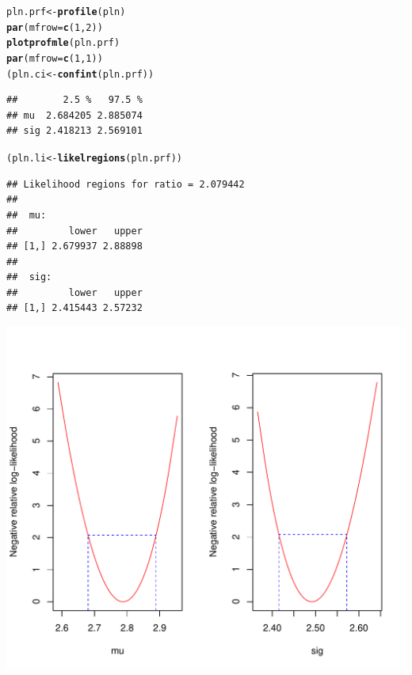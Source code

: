 \documentclass[12pt, A4]{article}\usepackage[]{graphicx}\usepackage[]{color}
\makeatletter
\def\maxwidth{ %
  \ifdim\Gin@nat@width>\linewidth
    \linewidth
  \else
    \Gin@nat@width
  \fi
}
\newcommand{\hlnum}[1]{\textcolor[rgb]{0.686,0.059,0.569}{#1}}%
\newcommand{\hlstd}[1]{\textcolor[rgb]{0.345,0.345,0.345}{#1}}%
\newcommand{\hlkwb}[1]{\textcolor[rgb]{0.69,0.353,0.396}{#1}}%
\newcommand{\hlkwc}[1]{\textcolor[rgb]{0.333,0.667,0.333}{#1}}%
\newcommand{\hlkwd}[1]{\textcolor[rgb]{0.737,0.353,0.396}{\textbf{#1}}}%
\newenvironment{kframe}{%
 \def\at@end@of@kframe{}%
 \ifinner\ifhmode%
  \def\at@end@of@kframe{\end{minipage}}%
  \begin{minipage}{\columnwidth}%
 \fi\fi%
 \def\FrameCommand##1{\hskip\@totalleftmargin \hskip-\fboxsep
 \colorbox{shadecolor}{##1}\hskip-\fboxsep
     \hskip-\linewidth \hskip-\@totalleftmargin \hskip\columnwidth}%
 \MakeFramed {\advance\hsize-\width
   \@totalleftmargin\z@ \linewidth\hsize
   \@setminipage}}%
 {\par\unskip\endMakeFramed%
 \at@end@of@kframe}
\newenvironment{knitrout}{}{} %
\makeatother
\begin{document}
\begin{knitrout}
\color{fgcolor}\begin{kframe}
\begin{alltt}
\hlstd{pln.prf} \hlkwb{<-} \hlkwd{profile}\hlstd{(pln)}
\hlkwd{par}\hlstd{(}\hlkwc{mfrow}\hlstd{=}\hlkwd{c}\hlstd{(}\hlnum{1}\hlstd{,}\hlnum{2}\hlstd{))}
\hlkwd{plotprofmle}\hlstd{(pln.prf)}
\hlkwd{par}\hlstd{(}\hlkwc{mfrow}\hlstd{=}\hlkwd{c}\hlstd{(}\hlnum{1}\hlstd{,}\hlnum{1}\hlstd{))}
\hlstd{(pln.ci} \hlkwb{<-} \hlkwd{confint}\hlstd{(pln.prf))}
\end{alltt}
\begin{verbatim}
##        2.5 %   97.5 %
## mu  2.684205 2.885074
## sig 2.418213 2.569101
\end{verbatim}
\begin{alltt}
\hlstd{(pln.li} \hlkwb{<-} \hlkwd{likelregions}\hlstd{(pln.prf))}
\end{alltt}
\begin{verbatim}
## Likelihood regions for ratio = 2.079442 
## 
##  mu:
##         lower   upper
## [1,] 2.679937 2.88898
## 
##  sig:
##         lower   upper
## [1,] 2.415443 2.57232
\end{verbatim}
\end{kframe}

{\centering \includegraphics[width=\maxwidth]{figure/confidence_and_likelihood_limits_of_PLN-1} 

}



\end{knitrout}
\end{document}
